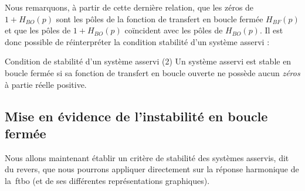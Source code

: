 Nous remarquons, à partir de cette dernière relation,
que les zéros de $1+H_{BO}(p)$ sont les pôles de la fonction de 
transfert en boucle fermée $H_{BF}(p)$ et que les pôles 
de $1+H_{BO}(p)$ co\"incident avec 
les pôles de $H_{BO}(p)$. Il est donc possible de 
réinterpréter la condition stabilité d'un système asservi :
\begin{criteria}{Condition de stabilité d'un système asservi (2)}
    Un système asservi est stable en boucle fermée si sa fonction 
    de transfert en boucle ouverte ne possède aucun \emph{zéros} à partie 
    réelle positive.
\end{criteria}
\subsection{Mise en évidence de l'instabilité en boucle fermée}
Nous allons maintenant établir un critère de stabilité des 
systèmes asservis, dit du revers, que nous pourrons appliquer directement sur la 
réponse harmonique de la~\gls{ftbo} (et de ses différentes représentations 
graphiques).

